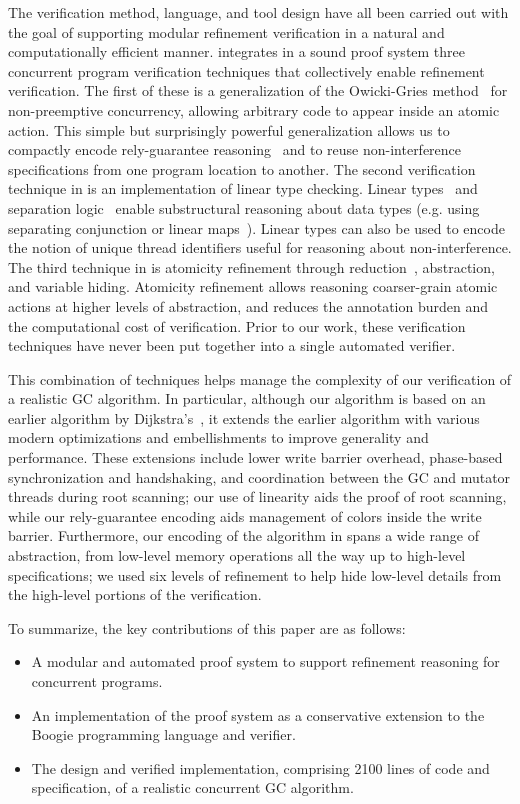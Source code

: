 The verification method, language, and tool design have all been carried out with the goal of supporting  modular refinement 
verification in a natural and computationally efficient manner. 
\civl integrates in a sound proof system three concurrent program verification techniques that collectively enable refinement verification. 
The first of these is a generalization of the Owicki-Gries method~\cite{OwickiG76} for non-preemptive concurrency, 
allowing arbitrary code to appear inside an atomic action. 
This simple but surprisingly powerful generalization allows us to compactly encode rely-guarantee reasoning~\cite{Jones83}
and to reuse non-interference specifications from one program location to another.
The second verification technique in \civl is an implementation of linear type checking.
Linear types~\cite{Wadler90lineartypes} and separation logic~\cite{Reynolds02} enable substructural reasoning about data types
(e.g. using separating conjunction or linear maps~\cite{LahiriQW11}).
Linear types can also be used to encode the notion of unique thread identifiers useful for reasoning about non-interference. 
The third technique in \civl is atomicity refinement through reduction~\cite{Lipton75}, abstraction, and variable hiding. 
Atomicity refinement allows reasoning coarser-grain atomic actions at higher levels of abstraction, 
and reduces the annotation burden and the computational cost of verification. 
Prior to our work, these verification techniques have never been put together into a single automated verifier.

This combination of techniques helps manage the complexity of our verification of a realistic GC algorithm.  
In particular, although our algorithm is based on an earlier algorithm by Dijkstra's~\cite{dijk78}, 
it extends the earlier algorithm with various modern optimizations and embellishments to improve generality and performance.  
These extensions include lower write barrier overhead, phase-based synchronization and handshaking, 
and coordination between the GC and mutator threads during root scanning; our use of linearity aids the proof of root scanning, 
while our rely-guarantee encoding aids management of colors inside the write barrier.  
Furthermore, our encoding of the algorithm in \civl spans a wide range of abstraction, 
from low-level memory operations all the way up to high-level specifications; 
we used six levels of refinement to help hide low-level details from the high-level portions of the verification.

To summarize, the key contributions of this paper are as follows:
\begin{itemize}
\item 
A modular and automated proof system to support refinement reasoning for concurrent programs.
\item 
An implementation of the proof system as a conservative extension to the Boogie programming language and verifier.
\item 
The design and verified implementation, comprising 2100 lines of code and specification, of a realistic concurrent GC algorithm.
\end{itemize}



